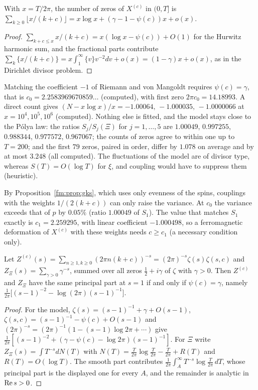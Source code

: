 \begin{proposition}[proved]\label{fm:prop:shiftcount}
With $x=T/2\pi$, the number of zeros of $X^{(c)}$ in $(0,T]$ is $\sum_{k\ge0}\lfloor x/(k+c)\rfloor=x\log x+(\gamma-1-\psi(c))x+o(x)$.
\end{proposition}

\begin{proof}
$\sum_{k+c\le x}x/(k+c)=x(\log x-\psi(c))+O(1)$ for the Hurwitz harmonic sum, and the fractional parts contribute $\sum_k\{x/(k+c)\}=x\int_1^\infty\{v\}v^{-2}dv+o(x)=(1-\gamma)x+o(x)$, as in the Dirichlet divisor problem.
\end{proof}

Matching the coefficient $-1$ of Riemann and von Mangoldt requires $\psi(c)=\gamma$, that is $c_0=2.2583969670859\ldots$ (computed), with first zero $2\pi c_0=14.18993$. A direct count gives $(N-x\log x)/x=-1.00064,\,-1.000035,\,-1.0000066$ at $x=10^4,10^5,10^6$ (computed). Nothing else is fitted, and the model stays close to the P\'olya law: the ratios $S_j/S_j(\Xi)$ for $j=1,\dots,5$ are $1.00049$, $0.997255$, $0.988344$, $0.977572$, $0.967067$; the counts of zeros agree to within one up to $T=200$; and the first $79$ zeros, paired in order, differ by $1.078$ on average and by at most $3.248$ (all computed). The fluctuations of the model are of divisor type, whereas $S(T)=O(\log T)$ for $\xi$, and coupling would have to suppress them (heuristic).

By Proposition~\ref{fm:prop:gks}, which uses only evenness of the spins, couplings with the weights $1/(2(k+c))$ can only raise the variance. At $c_0$ the variance exceeds that of $p$ by $0.05\%$ (ratio $1.00049$ of $S_1$). The value that matches $S_1$ exactly is $c_1=2.259295$, with linear coefficient $-1.000498$, so a ferromagnetic deformation of $X^{(c)}$ with these weights needs $c\ge c_1$ (a necessary condition only).

\begin{proposition}[proved]\label{fm:prop:polar}
Let $Z^{(c)}(s)=\sum_{n\ge1,k\ge0}(2\pi n(k+c))^{-s}=(2\pi)^{-s}\zeta(s)\zeta(s,c)$ and $Z_\Xi(s)=\sum_{\gamma>0}\gamma^{-s}$, summed over all zeros $\frac12+i\gamma$ of $\zeta$ with $\gamma>0$. Then $Z^{(c)}$ and $Z_\Xi$ have the same principal part at $s=1$ if and only if $\psi(c)=\gamma$, namely $\frac1{2\pi}\big[(s-1)^{-2}-\log(2\pi)(s-1)^{-1}\big]$.
\end{proposition}

\begin{proof}
For the model, $\zeta(s)=(s-1)^{-1}+\gamma+O(s-1)$, $\zeta(s,c)=(s-1)^{-1}-\psi(c)+O(s-1)$ and $(2\pi)^{-s}=(2\pi)^{-1}(1-(s-1)\log2\pi+\cdots)$ give $\frac1{2\pi}[(s-1)^{-2}+(\gamma-\psi(c)-\log2\pi)(s-1)^{-1}]$. For $\Xi$ write $Z_\Xi(s)=\int T^{-s}dN(T)$ with $N(T)=\frac T{2\pi}\log\frac T{2\pi}-\frac T{2\pi}+R(T)$ and $R(T)=O(\log T)$. The smooth part contributes $\frac1{2\pi}\int_A^\infty T^{-s}\log\frac T{2\pi}\,dT$, whose principal part is the displayed one for every $A$, and the remainder is analytic in $\operatorname{Re} s>0$.
\end{proof}

